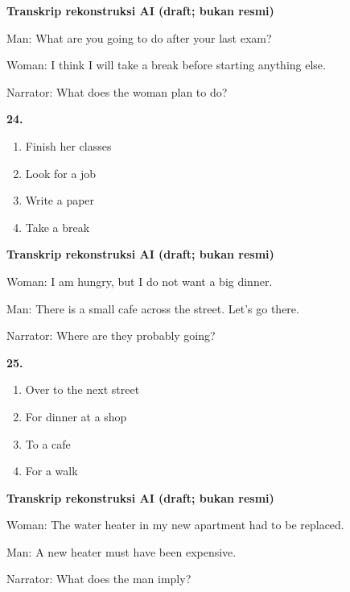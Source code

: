 \documentclass[12pt]{article}
\begin{document}
\par
\vspace{0.25\baselineskip}
\begin{exampleblock}
\textbf{Transkrip rekonstruksi AI (draft; bukan resmi)}\par
Man: What are you going to do after your last exam?\par
Woman: I think I will take a break before starting anything else.\par
Narrator: What does the woman plan to do?\par
\end{exampleblock}
\noindent\textbf{24.}
\begin{enumerate}[label=(\Alph*),leftmargin=*,itemsep=0.2em]
\item Finish her classes
\item Look for a job
\item Write a paper
\item Take a break
\end{enumerate}
\par
\vspace{0.25\baselineskip}
\begin{exampleblock}
\textbf{Transkrip rekonstruksi AI (draft; bukan resmi)}\par
Woman: I am hungry, but I do not want a big dinner.\par
Man: There is a small cafe across the street. Let's go there.\par
Narrator: Where are they probably going?\par
\end{exampleblock}
\noindent\textbf{25.}
\begin{enumerate}[label=(\Alph*),leftmargin=*,itemsep=0.2em]
\item Over to the next street
\item For dinner at a shop
\item To a cafe
\item For a walk
\end{enumerate}
\par
\vspace{0.25\baselineskip}
\begin{exampleblock}
\textbf{Transkrip rekonstruksi AI (draft; bukan resmi)}\par
Woman: The water heater in my new apartment had to be replaced.\par
Man: A new heater must have been expensive.\par
Narrator: What does the man imply?\par
\end{exampleblock}
\end{document}
